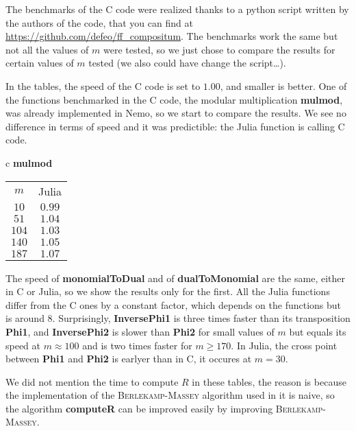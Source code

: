 \documentclass[a4paper,11pt]{article}
\theoremstyle{break}
\theoremstyle{definition}
\theoremstyle{remark}
\begin{document}
The benchmarks of the C code were realized thanks to a python 
script written by the authors of the code, that you can find at 
\url{https://github.com/defeo/ff\_compositum}. The benchmarks work the same but not 
all the values of $m$ were tested, so we just chose to compare the results for 
certain values of $m$ tested (we also could have change the script\dots).

In the tables, the speed of
the C code is set to $1.00$, and smaller is better. One of the functions 
benchmarked in the C code, the modular multiplication \textbf{mulmod}, was 
already implemented in Nemo, so we start to compare the results. We see no
difference in terms of speed and it was predictible: the Julia
function is calling C code.

\begin{center}
  \begin{tabular}[here]{c}
    \textbf{mulmod} \\
    \begin{tabular}[here]{cc}
   $m$ & Julia \\
   $10$ & $0.99$\\
   $51$ & $1.04$\\
   $104$ & $1.03$\\
   $140$ & $1.05$\\
   $187$ & $1.07$\\
    \end{tabular}
  \end{tabular}
\end{center}
The speed of \textbf{monomialToDual} and of \textbf{dualToMonomial} are the 
same, either in C or Julia, so we show the results only for the first.
All the Julia functions differ from the C ones by a
constant factor, which depends on the functions but is around $8$.
Surprisingly, \textbf{InversePhi1} is three times faster than its transposition
\textbf{Phi1}, and \textbf{InversePhi2} is slower than \textbf{Phi2} for small
values of $m$ but equals its speed at $m\approx 100$ and is two times faster for $m\geq170$.
In Julia, the cross point between \textbf{Phi1} and \textbf{Phi2} is earlyer than
in C, it occures at $m=30$.

We did not mention the time to compute $R$ in these tables, the reason 
is because the implementation of the \textsc{Berlekamp-Massey} algorithm used 
in it is naive, so the algorithm \textbf{computeR} can be improved easily by 
improving \textsc{Berlekamp-Massey}.
\end{document}
